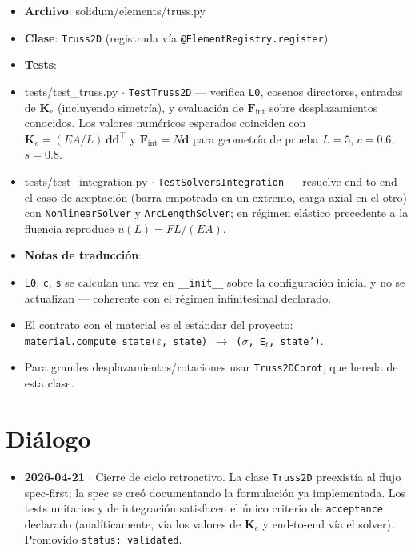 \documentclass[11pt,letterpaper,oneside]{report}
\begin{document}
\begin{itemize}
  \item \textbf{Archivo}: solidum/elements/truss.py
  \item \textbf{Clase}: \texttt{Truss2D} (registrada vía \texttt{@ElementRegistry.register})
  \item \textbf{Tests}:
  \item tests/test\_truss.py \ensuremath{\cdot} \texttt{TestTruss2D} --- verifica \texttt{L0}, cosenos directores, entradas de $\mathbf K_e$ (incluyendo simetría), y evaluación de $\mathbf F_{\text{int}}$ sobre desplazamientos conocidos. Los valores numéricos esperados coinciden con $\mathbf K_e = (EA/L)\,\mathbf d\mathbf d^\top$ y $\mathbf F_{\text{int}} = N\mathbf d$ para geometría de prueba $L=5$, $c=0.6$, $s=0.8$.
  \item tests/test\_integration.py \ensuremath{\cdot} \texttt{TestSolversIntegration} --- resuelve end-to-end el caso de aceptación (barra empotrada en un extremo, carga axial en el otro) con \texttt{NonlinearSolver} y \texttt{ArcLengthSolver}; en régimen elástico precedente a la fluencia reproduce $u(L)=FL/(EA)$.
  \item \textbf{Notas de traducción}:
  \item \texttt{L0}, \texttt{c}, \texttt{s} se calculan una vez en \texttt{\_\_init\_\_} sobre la configuración inicial y no se actualizan --- coherente con el régimen infinitesimal declarado.
  \item El contrato con el material es el estándar del proyecto: \texttt{material.compute\_state(\ensuremath{\varepsilon}, state) \ensuremath{\to} (\ensuremath{\sigma}, E\ensuremath{_{t}}, state')}.
  \item Para grandes desplazamientos/rotaciones usar \texttt{Truss2DCorot}, que hereda de esta clase.
\end{itemize}


\section{Diálogo}

\begin{itemize}
  \item \textbf{2026-04-21} \ensuremath{\cdot} Cierre de ciclo retroactivo. La clase \texttt{Truss2D} preexistía al flujo spec-first; la spec se creó documentando la formulación ya implementada. Los tests unitarios y de integración satisfacen el único criterio de \texttt{acceptance} declarado (analíticamente, vía los valores de $\mathbf K_e$ y end-to-end vía el solver). Promovido \texttt{status: validated}.
\end{itemize}
\end{document}
